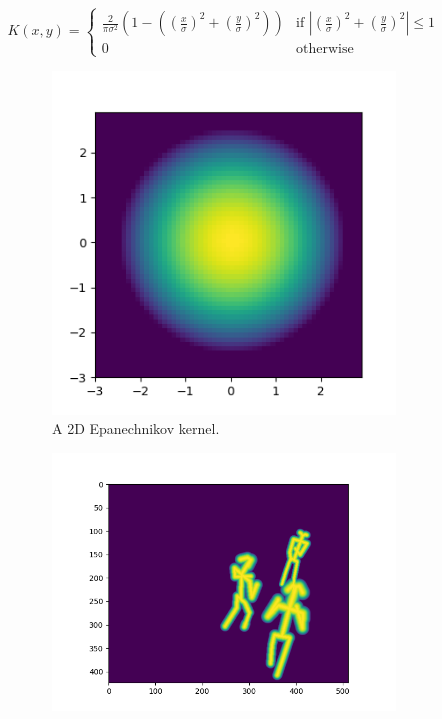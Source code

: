 \begin{equation}
  \label{eq:epanechnikov}
  K(x, y) =
  \begin{cases}
    \frac{2}{\pi\sigma^{2}}(1 - ((\frac{x}{\sigma})^{2} + (\frac{y}{\sigma})^{2})) & \text{if } |(\frac{x}{\sigma})^{2} + (\frac{y}{\sigma})^{2}| \leq 1\\
    0 & \text{otherwise}
  \end{cases}
\end{equation}

\begin{figure}
  \begin{subfigure}{.4\textwidth}
    \centering
    \includegraphics[width=\linewidth]{img/epanechnikov_2d}
    \caption{A 2D Epanechnikov \cite{epanechnikov_1969} kernel.}
    \label{fig:epanechnikov}
  \end{subfigure}%
  \begin{subfigure}{.6\textwidth}
    \centering
    \includegraphics[width=\linewidth]{img/target_maps}

\end{subfigure}
\end{figure}
